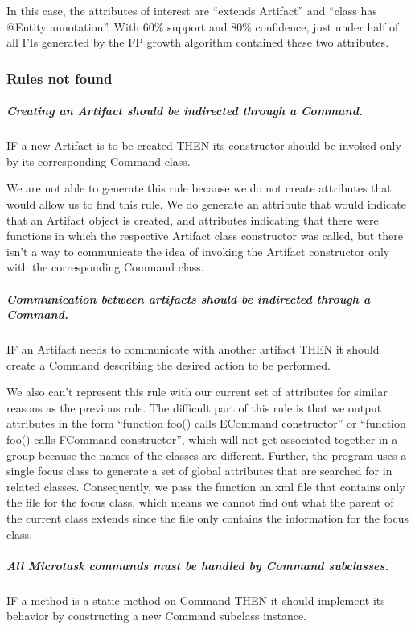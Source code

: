\documentclass[12pt]{article}
\begin{document}
		In this case, the attributes of interest are ``extends Artifact” and ``class has @Entity annotation”. With 60\% support and 80\% confidence, just under half of all FIs generated by the FP growth algorithm contained these two attributes. 
		




	
	\subsubsection{Rules not found}
	
		\subparagraph{Creating an Artifact should be indirected through a Command.} IF a new Artifact is to be created THEN its constructor should be invoked only by its corresponding Command class. 
		
		We are not able to generate this rule because we do not create attributes that would allow us to find this rule. We do generate an attribute that would indicate that an Artifact object is created, and attributes indicating that there were functions in which the respective Artifact class constructor was called, but there isn’t a way to communicate the idea of invoking the Artifact constructor only with the corresponding Command class.
		
		\subparagraph{Communication between artifacts should be indirected through a Command.} IF an Artifact needs to communicate with another artifact THEN it should create a Command describing the desired action to be performed.

        We also can’t represent this rule with our current set of attributes for similar reasons as the previous rule. The difficult part of this rule is that we output attributes in the form “function foo() calls ECommand constructor” or “function foo() calls FCommand constructor”, which will not get associated together in a group because the names of the classes are different. Further, the program uses a single focus class to generate a set of global attributes that are searched for in related classes. Consequently, we pass the function an xml file that contains only the file for the focus class, which means we cannot find out what the parent of the current class extends since the file only contains the information for the focus class. 
        
        		\subparagraph{All Microtask commands must be handled by Command subclasses.} IF a method is a static method on Command THEN it should implement its behavior by constructing a new Command subclass instance.
		
\end{document}
